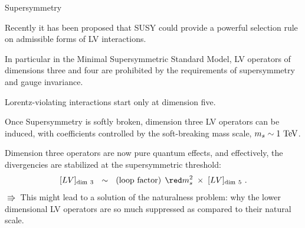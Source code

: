 \documentclass[pdf,PItalk,slideColor,colorBG,accumulate]{prosper}
\begin{document}
{
\begin{slide}[Replace]{\small Supersymmetry }

	Recently it has been proposed that SUSY could provide a 
	powerful selection rule on admissible forms of LV interactions.

	In particular in the Minimal Supersymmetric Standard Model,
	LV operators of dimensions three and four are prohibited
	by the requirements of supersymmetry and gauge invariance.

	Lorentz-violating interactions start only at dimension five.

	Once Supersymmetry is softly broken, dimension three LV
	operators can be induced, with coefficients controlled
	by the soft-breaking mass scale, 
	{\red $ m_s \sim 1~{\rm TeV} $}.	

	Dimension three operators are now pure quantum effects, and
	effectively, the divergencies are stabilized at the 
	supersymmetric threshold:
\[
[LV]_{\rm dim~3} ~~\sim~~ ({\rm loop~factor}) \, 
\;{\red m_{s}^2}\;
\times\; [LV]_{{\rm dim}~5}~.
\]
	$ \Rrightarrow $ This might lead to a solution of the
	naturalness problem: why the lower dimensional LV operators
	are so much suppressed as compared to their natural scale.

\end{slide}
}
\end{document}
